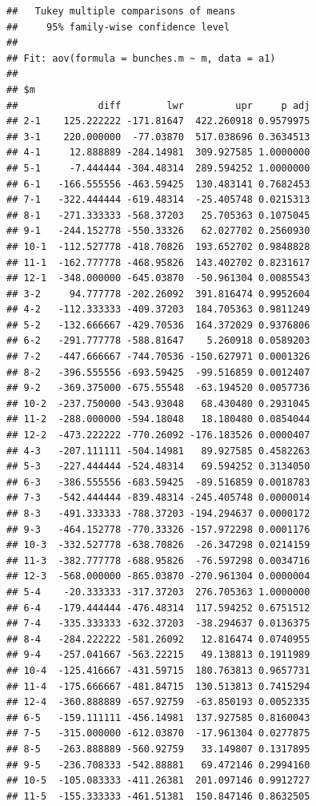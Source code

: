 \documentclass[]{book}
\theoremstyle{definition}
\theoremstyle{definition}
\theoremstyle{remark}
\begin{document}
\begin{verbatim}
##   Tukey multiple comparisons of means
##     95% family-wise confidence level
## 
## Fit: aov(formula = bunches.m ~ m, data = a1)
## 
## $m
##              diff        lwr         upr     p adj
## 2-1    125.222222 -171.81647  422.260918 0.9579975
## 3-1    220.000000  -77.03870  517.038696 0.3634513
## 4-1     12.888889 -284.14981  309.927585 1.0000000
## 5-1     -7.444444 -304.48314  289.594252 1.0000000
## 6-1   -166.555556 -463.59425  130.483141 0.7682453
## 7-1   -322.444444 -619.48314  -25.405748 0.0215313
## 8-1   -271.333333 -568.37203   25.705363 0.1075045
## 9-1   -244.152778 -550.33326   62.027702 0.2560930
## 10-1  -112.527778 -418.70826  193.652702 0.9848828
## 11-1  -162.777778 -468.95826  143.402702 0.8231617
## 12-1  -348.000000 -645.03870  -50.961304 0.0085543
## 3-2     94.777778 -202.26092  391.816474 0.9952604
## 4-2   -112.333333 -409.37203  184.705363 0.9811249
## 5-2   -132.666667 -429.70536  164.372029 0.9376806
## 6-2   -291.777778 -588.81647    5.260918 0.0589203
## 7-2   -447.666667 -744.70536 -150.627971 0.0001326
## 8-2   -396.555556 -693.59425  -99.516859 0.0012407
## 9-2   -369.375000 -675.55548  -63.194520 0.0057736
## 10-2  -237.750000 -543.93048   68.430480 0.2931045
## 11-2  -288.000000 -594.18048   18.180480 0.0854044
## 12-2  -473.222222 -770.26092 -176.183526 0.0000407
## 4-3   -207.111111 -504.14981   89.927585 0.4582263
## 5-3   -227.444444 -524.48314   69.594252 0.3134050
## 6-3   -386.555556 -683.59425  -89.516859 0.0018783
## 7-3   -542.444444 -839.48314 -245.405748 0.0000014
## 8-3   -491.333333 -788.37203 -194.294637 0.0000172
## 9-3   -464.152778 -770.33326 -157.972298 0.0001176
## 10-3  -332.527778 -638.70826  -26.347298 0.0214159
## 11-3  -382.777778 -688.95826  -76.597298 0.0034716
## 12-3  -568.000000 -865.03870 -270.961304 0.0000004
## 5-4    -20.333333 -317.37203  276.705363 1.0000000
## 6-4   -179.444444 -476.48314  117.594252 0.6751512
## 7-4   -335.333333 -632.37203  -38.294637 0.0136375
## 8-4   -284.222222 -581.26092   12.816474 0.0740955
## 9-4   -257.041667 -563.22215   49.138813 0.1911989
## 10-4  -125.416667 -431.59715  180.763813 0.9657731
## 11-4  -175.666667 -481.84715  130.513813 0.7415294
## 12-4  -360.888889 -657.92759  -63.850193 0.0052335
## 6-5   -159.111111 -456.14981  137.927585 0.8160043
## 7-5   -315.000000 -612.03870  -17.961304 0.0277875
## 8-5   -263.888889 -560.92759   33.149807 0.1317895
## 9-5   -236.708333 -542.88881   69.472146 0.2994160
## 10-5  -105.083333 -411.26381  201.097146 0.9912727
## 11-5  -155.333333 -461.51381  150.847146 0.8632505

\end{verbatim}
\end{document}
